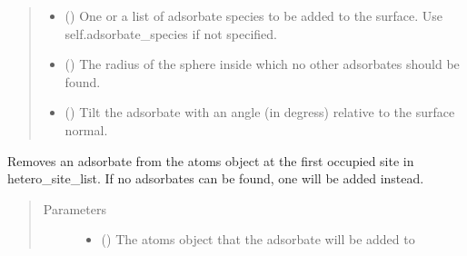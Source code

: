 \documentclass[letterpaper,10pt,english]{sphinxmanual}
\begin{document}
\begin{fulllineitems}
\begin{fulllineitems}
\begin{quote}
\begin{description}
\begin{itemize}
\item {} 
 (\sphinxstyleliteralemphasis{\sphinxupquote{, }}) \textendash{} One or a list of adsorbate species to be added to the surface.
Use self.adsorbate\_species if not specified.

\item {} 
 (\sphinxstyleliteralemphasis{\sphinxupquote{, }}) \textendash{} The radius of the sphere inside which no other adsorbates
should be found.

\item {} 
 (\sphinxstyleliteralemphasis{\sphinxupquote{, }}) \textendash{} Tilt the adsorbate with an angle (in degress) relative to the
surface normal.

\end{itemize}

\end{description}\end{quote}

\end{fulllineitems}


\begin{fulllineitems}
\label{\detokenize{ga:acat.ga.adsorbate_operators.AdsorbateOperator.remove_adsorbate}}
Removes an adsorbate from the atoms object at the first occupied
site in hetero\_site\_list. If no adsorbates can be found, one will be
added instead.
\begin{quote}\begin{description}
\item[{Parameters}] \leavevmode\begin{itemize}
\item {} 
 () \textendash{} The atoms object that the adsorbate will be added to


\end{itemize}
\end{description}
\end{quote}
\end{fulllineitems}
\end{fulllineitems}
\end{document}
